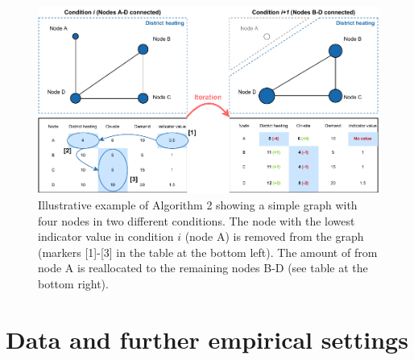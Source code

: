 \documentclass[review]{elsarticle}
\begin{document}
\begin{figure}[h]
	\centering
	\includegraphics[width=1\linewidth]{figures/_appendix/Method_appendix.pdf}
	\caption{Illustrative example of Algorithm 2 showing a simple graph with four nodes in two different conditions. The node with the lowest indicator value in condition $i$ (node A) is removed from the graph (markers [1]-[3] in the table at the bottom left). The amount of  from node A is reallocated to the remaining nodes B-D (see table at the bottom right).}
	\label{fig:app:method}
\end{figure}

\section{Data and further empirical settings}\label{appendixA}
\begin{table}[h]
	\centering
	\caption{Empirical data settings}
	\label{tab:a2}
\end{table}
\end{document}
